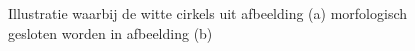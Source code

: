 \documentclass[a4paper,kulak]{kulakarticle}
\begin{document}
\begin{figure}[H]
	\centering
	\qquad
	
	\caption{Illustratie waarbij de witte cirkels uit afbeelding (a) morfologisch gesloten worden in afbeelding (b)}
	\label{figuur morf}
\end{figure}
	
	
		
	
	
\end{document}
